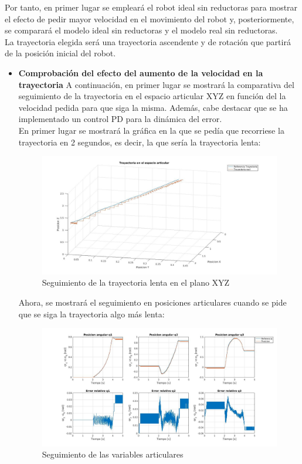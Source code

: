 Por tanto, en primer lugar se empleará el robot ideal sin reductoras para mostrar el efecto de pedir mayor velocidad en el movimiento del robot y, posteriormente, se comparará el modelo ideal sin reductoras y el modelo real sin reductoras.\\
La trayectoria elegida será una trayectoria ascendente y de rotación que partirá de la posición inicial del robot.

\begin{itemize}
	\item \textbf{Comprobación del efecto del aumento de la velocidad en la trayectoria}
	A continuación, en primer lugar se mostrará la comparativa del seguimiento de la trayectoria en el espacio articular XYZ en función del la velocidad pedida para que siga la misma. Además, cabe destacar que se ha implementado un control PD para la dinámica del error.\\
	En primer lugar se mostrará la gráfica en la que se pedía que recorriese la trayectoria en 2 segundos, es decir, la que sería la trayectoria lenta:

	\begin{figure}[h!]
		\centering
		\includegraphics[width=.8\textwidth]{exp4_trayPDidealSR_lento}
		\caption{Seguimiento de la trayectoria lenta en el plano XYZ}
	\end{figure}

	Ahora, se mostrará el seguimiento en posiciones articulares cuando se pide que se siga la trayectoria algo más lenta:

	\begin{figure}[h!]
		\centering
		\includegraphics[width=.8\textwidth]{exp4_posPDidealSR_lento}
		\caption{Seguimiento de las variables articulares}
	\end{figure}


\end{itemize}
